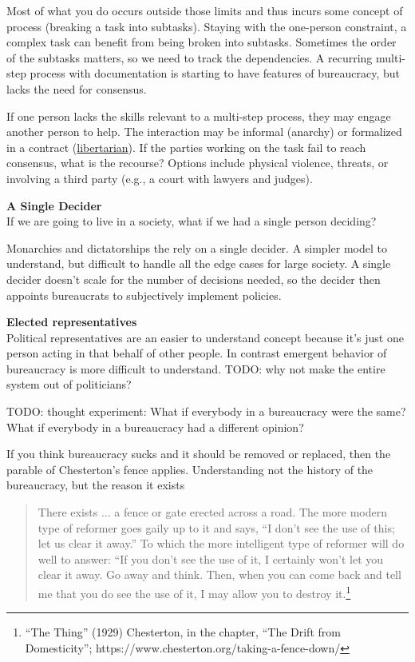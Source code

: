 Most of what you do occurs outside those limits and thus incurs some concept of \gls{process} (breaking a task into subtasks). Staying with the one-person constraint, a complex task can benefit from being broken into subtasks. Sometimes the order of the subtasks matters, so we need to track the dependencies. A recurring multi-step process with documentation is starting to have features of bureaucracy, but lacks the need for consensus. 

If one person lacks the skills relevant to a multi-step process, they may engage another person to help. The interaction may be informal (anarchy) or formalized in a contract (\href{https://en.wikipedia.org/wiki/Libertarianism}{libertarian}). If the parties working on the task fail to reach consensus, what is the recourse? Options include physical violence, threats, or involving a third party (e.g., a court with lawyers and judges). 

\textbf{A Single Decider}\\
If we are going to live in a society, what if we had a single person deciding?

Monarchies and dictatorships the rely on a single decider. A simpler model to understand, but difficult to handle all the edge cases for large society. A single decider doesn't scale for the number of decisions needed, so the decider then appoints bureaucrats to subjectively implement policies. 

\textbf{Elected representatives}\\
Political representatives are an easier to understand concept because it's just one person acting in that behalf of other people.
In contrast emergent behavior of bureaucracy is more difficult to understand. TODO: why not make the entire system out of politicians?


TODO: thought experiment: 
What if everybody in a bureaucracy were the same?
What if everybody in a bureaucracy had a different opinion?


If you think bureaucracy sucks and it should be removed or replaced, then the parable of Chesterton's fence applies. Understanding not the history of the bureaucracy, but the reason it exists

\begin{quote}
There exists ... a fence or gate erected across a road. The more modern type of reformer goes gaily up to it and says, “I don’t see the use of this; let us clear it away.” To which the more intelligent type of reformer will do well to answer: “If you don’t see the use of it, I certainly won’t let you clear it away. Go away and think. Then, when you can come back and tell me that you do see the use of it, I may allow you to destroy it.\footnote{``The Thing'' (1929) Chesterton, in the chapter, “The Drift from Domesticity”; https://www.chesterton.org/taking-a-fence-down/}
\end{quote}

